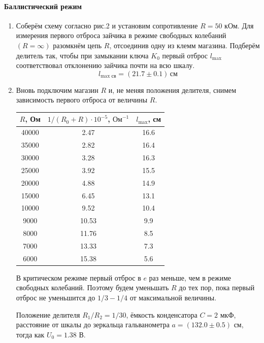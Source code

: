 \documentclass[12pt]{article}
\begin{document}
\paragraph{Баллистический режим}
\begin{enumerate}
	\item
		Соберём схему согласно рис.2 и установим сопротивление $R = 50$ кОм. Для измерения первого отброса зайчика в режиме свободных колебаний $\left(R = \infty\right)$ разомкнём цепь $R$, отсоединив одну из клемм магазина. Подберём делитель так, чтобы при замыкании ключа $K_0$ первый отброс $l_\text{max}$ соответствовал отклонению зайчика почти на всю шкалу.
\[
	l_\text{max св} = \left(21.7 \pm 0.1\right) \, \text{см}
\]
	\item
		Вновь подключим магазин $R$ и, не меняя положения делителя, снимем зависимость первого отброса от величины $R$.
		\newpage		
		\begin{table}[h!]
			\centering
			\begin{tabular}{|c|c|c|}
			\hline
			$R$, Ом & $1 / (R_0 + R) \cdot 10^{-5}$, $\text{Ом}^{-1}$ & $l_\text{max}$, см \\
			\hline
			40000 & 2.47 & 16.6\\
			\hline
			35000 & 2.82 & 16.4\\
			\hline
			30000 & 3.28 & 16.3\\
			\hline
			25000 & 3.92 & 15.5\\
			\hline
			20000 & 4.88 & 14.9\\
			\hline
			15000 & 6.45 & 13.1\\
			\hline
			10000 & 9.52 & 10.4\\
			\hline
			9000 & 10.53 & 9.9\\
			\hline
			8000 & 11.76 & 8.5\\
			\hline
			7000 & 13.33 & 7.3\\
            \hline
            6000 & 15.38 & 5.6\\		
			\hline
			\end{tabular}
		\end{table}
	\par
		В критическом режиме первый отброс в $e$ раз меньше, чем в режиме свободных колебаний. Поэтому будем уменьшать $R$ до тех пор, пока первый отброс не уменьшится до $1/3 - 1/4$ от максимальной величины.
	\par
		Положение делителя $R_1 / R_2 = 1 / 30$, ёмкость конденсатора $C = 2$ мкФ, расстояние от шкалы до зеркальца гальванометра $a = \left(132.0 \pm 0.5\right)$ см, тогда как $U_0 = 1.38$ В. 		

\end{enumerate}
\end{document}
